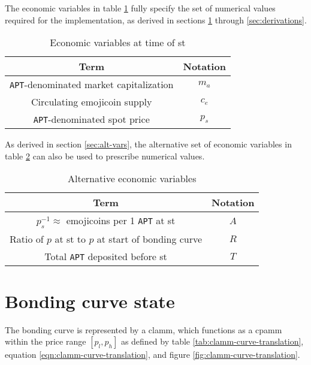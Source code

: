 \documentclass[table, twocolumn]{article}
\begin{document}
The economic variables in table \ref{tab:state-model-variables} fully specify the set of
numerical values required for the implementation, as derived in sections
\ref{sec:bonding-curve} through \ref{sec:derivations}.

\begin{table}[!htb]
  \centering
  \begin{tabular}{|c|c|}
    \hline \rowcolor{blue}
    Term                                           & Notation \\ \hline
    \texttt{APT}-denominated market capitalization & $m_a$    \\ \hline
    Circulating emojicoin supply                   & $c_e$    \\ \hline
    \texttt{APT}-denominated spot price            & $p_s$    \\ \hline
  \end{tabular}
  \caption{Economic variables at time of \gls*{st}}
  \label{tab:state-model-variables}
\end{table}

As derived in section \ref{sec:alt-vars}, the alternative set of economic variables
in table \ref{tab:state-model-variables-alt} can also be used to prescribe numerical
values.

\begin{table}[!htb]
  \centering
  \begin{tabular}{|c|c|}
    \hline \rowcolor{blue}
    Term                                                          & Notation \\ \hline
    $p_s^{-1} \approx$ emojicoins per 1 \texttt{APT} at \gls*{st} & $A$      \\ \hline
    Ratio of $p$ at \gls*{st} to $p$ at start of bonding curve    & $R$      \\ \hline
    Total \texttt{APT} deposited before \gls*{st}                 & $T$      \\ \hline
  \end{tabular}
  \caption{Alternative economic variables}
  \label{tab:state-model-variables-alt}
\end{table}

\section{Bonding curve state} \label{sec:bonding-curve}

The bonding curve is represented by a \gls*{clamm}, which functions as a \gls*{cpamm}
within the price range $[p_l, p_h]$ as defined by table
\ref{tab:clamm-curve-translation}, equation \ref{eqn:clamm-curve-translation}, and
figure \ref{fig:clamm-curve-translation}.
\end{document}

